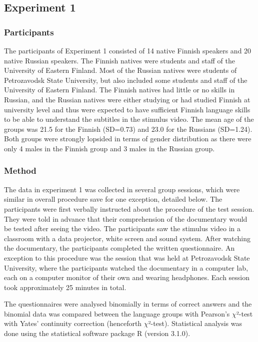 \documentclass[output=paper]{langsci/langscibook}
\begin{document}
\subsection{Experiment 1}

\subsubsection{Participants}

The participants of Experiment 1 consisted of 14 native Finnish speakers and 20 native Russian speakers. The Finnish natives were students and staff of the University of Eastern Finland. Most of the Russian natives were students of Petrozavodsk State University, but also included some students and staff of the University of Eastern Finland. The Finnish natives had little or no skills in Russian, and the Russian natives were either studying or had studied Finnish at university level and thus were expected to have sufficient Finnish language skills to be able to understand the subtitles in the stimulus video. The mean age of the groups was 21.5 for the Finnish (SD=0.73) and 23.0 for the Russians (SD=1.24). Both groups were strongly lopsided in terms of gender distribution as there were only 4 males in the Finnish group and 3 males in the Russian group.

\subsubsection{Method}

The data in experiment 1 was collected in several group sessions, which were similar in overall procedure save for one exception, detailed below. The participants were first verbally instructed about the procedure of the test session. They were told in advance that their comprehension of the documentary would be tested after seeing the video. The participants saw the stimulus video in a classroom with a data projector, white screen and sound system. After watching the documentary, the participants completed the written questionnaire. An exception to this procedure was the session that was held at Petrozavodsk State University, where the participants watched the documentary in a computer lab, each on a computer monitor of their own and wearing headphones. Each session took approximately 25 minutes in total.

The questionnaires were analysed binomially in terms of correct answers and the binomial data was compared between the language groups with Pearson’s $\chi $²-test with Yates’ continuity correction (henceforth $\chi $²-test). Statistical analysis was done using the statistical software package R (version 3.1.0).
\end{document}
